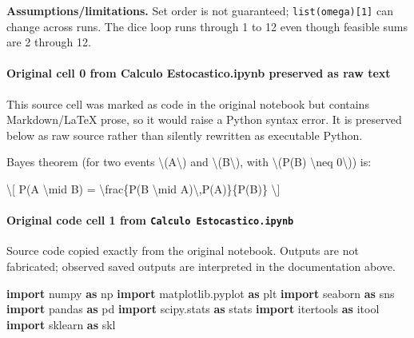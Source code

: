 \documentclass[
  11pt,
]{article}
\newenvironment{Shaded}{}{}
\newcommand{\ImportTok}[1]{\textcolor[rgb]{0.00,0.50,0.00}{\textbf{#1}}}
\newcommand{\NormalTok}[1]{#1}
\begin{document}
\textbf{Assumptions/limitations.} Set order is not guaranteed; \texttt{list(omega){[}1{]}} can change across runs. The dice loop runs through 1 to 12 even though feasible sums are 2 through 12.

\paragraph{Original cell 0 from Calculo Estocastico.ipynb preserved as raw text}\label{original-cell-0-from-calculo-estocasticoipynb-preserved-as-raw-text}

This source cell was marked as code in the original notebook but contains Markdown/LaTeX prose, so it would raise a Python syntax error. It is preserved below as raw source rather than silently rewritten as executable Python.

\begin{Shaded}
\begin{Highlighting}[]
\NormalTok{Bayes\textquotesingle{} theorem (for two events \textbackslash{}(A\textbackslash{}) and \textbackslash{}(B\textbackslash{}), with \textbackslash{}(P(B) \textbackslash{}neq 0\textbackslash{})) is:}

\NormalTok{\textbackslash{}[}
\NormalTok{P(A \textbackslash{}mid B) = \textbackslash{}frac\{P(B \textbackslash{}mid A)\textbackslash{},P(A)\}\{P(B)\}}
\NormalTok{\textbackslash{}]}
\end{Highlighting}
\end{Shaded}

\paragraph{\texorpdfstring{Original code cell 1 from \texttt{Calculo\ Estocastico.ipynb}}{Original code cell 1 from Calculo Estocastico.ipynb}}\label{original-code-cell-1-from-calculo-estocasticoipynb}

Source code copied exactly from the original notebook. Outputs are not fabricated; observed saved outputs are interpreted in the documentation above.

\begin{Shaded}
\begin{Highlighting}[]
\ImportTok{import}\NormalTok{ numpy }\ImportTok{as}\NormalTok{ np}
\ImportTok{import}\NormalTok{ matplotlib.pyplot }\ImportTok{as}\NormalTok{ plt}
\ImportTok{import}\NormalTok{ seaborn }\ImportTok{as}\NormalTok{ sns}
\ImportTok{import}\NormalTok{ pandas }\ImportTok{as}\NormalTok{ pd}
\ImportTok{import}\NormalTok{ scipy.stats }\ImportTok{as}\NormalTok{ stats}
\ImportTok{import}\NormalTok{ itertools }\ImportTok{as}\NormalTok{ itool}
\ImportTok{import}\NormalTok{ sklearn }\ImportTok{as}\NormalTok{ skl}
\end{Highlighting}
\end{Shaded}
\end{document}
